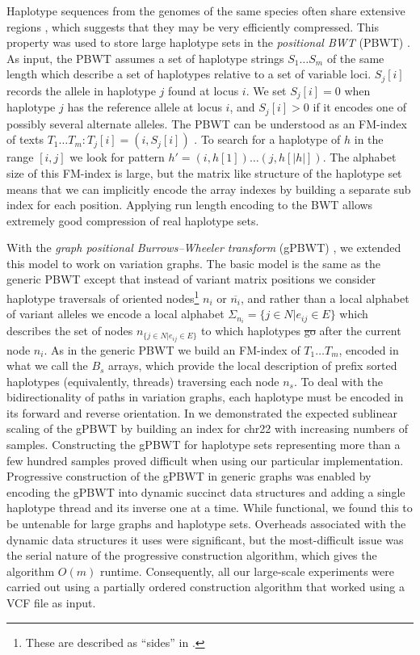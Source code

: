 \documentclass[a4paper,12pt,numbered,oneside]{Classes/PhDThesisPSnPDF}
\providecommand{\DIFaddtex}[1]{{\protect\color{blue}\uwave{#1}}} %
\providecommand{\DIFdeltex}[1]{{\protect\color{red}\sout{#1}}}                      %
\providecommand{\DIFaddbegin}{} %
\providecommand{\DIFaddend}{} %
\providecommand{\DIFdelbegin}{} %
\providecommand{\DIFdelend}{} %
\providecommand{\DIFadd}[1]{\texorpdfstring{\DIFaddtex{#1}}{#1}} %
\providecommand{\DIFdel}[1]{\texorpdfstring{\DIFdeltex{#1}}{}} %
\begin{document}
Haplotype sequences from the genomes of the same species often share extensive regions \DIFaddbegin \DIFadd{of homology}\DIFaddend , which suggests that they may be very efficiently compressed.
This property was used to store large haplotype sets in the \emph{positional BWT} (PBWT) \cite{durbin2014efficient}.
As input, the PBWT assumes a set of haplotype strings $S_1 \ldots S_m$ of the same length which describe a set of haplotypes relative to a set of variable loci.
$S_j[i]$ records the allele in haplotype $j$ found at locus $i$.
We set $S_j[i] = 0$ when haplotype $j$ has the reference allele at locus $i$, and $S_j[i] > 0$ if it encodes one of possibly several alternate alleles.
The PBWT can be understood as an FM-index of texts $T_1 \ldots T_m : T_j[i] = (i, S_j[i])$ \cite{gagie2017wheeler}.
To search for a haplotype of $h$ in the range $[i,j]$ we look for pattern $h' = (i, h[1]) \ldots (j, h[|h|])$.
The alphabet size of this FM-index is large, but the matrix like structure of the haplotype set means that we can implicitly encode the array indexes by building a separate sub index for each position.
Applying run length encoding to the BWT allows extremely good compression of real haplotype sets.

With the \emph{graph positional Burrows–Wheeler transform} (gPBWT) \cite{Novak2017gPBWT}, we extended this model to work on variation graphs.
The basic model is the same as the generic PBWT except that instead of variant matrix positions we consider haplotype traversals of oriented nodes\footnote{These are described as ``sides'' in \cite{Novak2017gPBWT}.} $n_i$ or $\overline{n_i}$, and rather than a local alphabet of variant alleles we encode a local alphabet $\Sigma_{n_i} = \{ j \in N | e_{ij} \in E \}$ which describes the set of nodes $n_{\{j \in N | e_{ij} \in E \}}$ to which haplotypes \DIFdelbegin \DIFdel{go }\DIFdelend \DIFaddbegin \DIFadd{continue immediately }\DIFaddend after the current node $n_i$.
As in the generic PBWT we build an FM-index of $T_1 \ldots T_m$, encoded in what we call the $B_s$ arrays, which provide the local description of prefix sorted haplotypes (equivalently, threads) traversing each node $n_s$.
To deal with the bidirectionality of paths in variation graphs, each haplotype must be encoded in its forward and reverse orientation.
In \cite{Novak2017gPBWT} we demonstrated the expected sublinear scaling of the gPBWT by building an index for chr22 with increasing numbers of samples.
Constructing the gPBWT for haplotype sets representing more than a few hundred samples proved difficult when using our particular implementation.
Progressive construction of the gPBWT in generic graphs was enabled by encoding the gPBWT into dynamic succinct data structures and adding a single haplotype thread and its inverse one at a time.
While functional, we found this to be untenable for large graphs and haplotype sets.
Overheads associated with the dynamic data structures it uses were significant, but the most-difficult issue was the serial nature of the progressive construction algorithm, which gives the algorithm $O(m)$ runtime.
Consequently, all our large-scale experiments were carried out using a partially ordered construction algorithm that worked using a VCF file as input.
\end{document}
